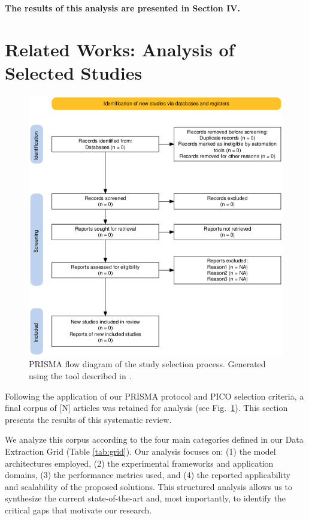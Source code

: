 \documentclass[conference]{IEEEtran}
\begin{document}
\textbf{The results of this analysis are presented in Section IV.}

\section{Related Works: Analysis of Selected Studies}

\begin{figure}[htbp]
\centerline{\includegraphics[width=\columnwidth]{prisma_flow.png}}
\caption{PRISMA flow diagram of the study selection process. Generated using the tool described in \cite{haddawayPRISMA2020PackageShiny2022}.}
\label{fig:prisma}
\end{figure}

Following the application of our PRISMA protocol and PICO selection criteria, a final corpus of [N] articles was retained for analysis (see Fig.~\ref{fig:prisma}). This section presents the results of this systematic review. 

We analyze this corpus according to the four main categories defined in our Data Extraction Grid (Table \ref{tab:grid}). Our analysis focuses on: (1) the model architectures employed, (2) the experimental frameworks and application domains, (3) the performance metrics used, and (4) the reported applicability and scalability of the proposed solutions. This structured analysis allows us to synthesize the current state-of-the-art and, most importantly, to identify the critical gaps that motivate our research.
\end{document}
